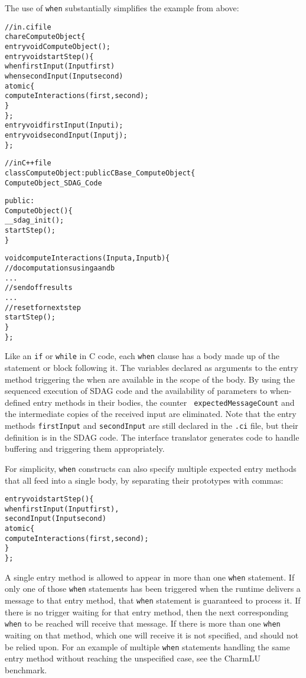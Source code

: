 The use of {\tt when} substantially simplifies the example from above:
\begin{center}
\begin{alltt}
// in .ci file
chare ComputeObject \{
  entry void ComputeObject();
  entry void startStep() \{
    when firstInput(Input first)
      when secondInput(Input second)
        atomic \{
          computeInteractions(first, second);
        \}
  \};
  entry void firstInput(Input i);
  entry void secondInput(Input j);
\};

// in C++ file
class ComputeObject : public CBase_ComputeObject \{
  ComputeObject_SDAG_Code

public:
  ComputeObject() \{
    __sdag_init();
    startStep();
  \}

  void computeInteractions(Input a, Input b) \{
    // do computations using a and b
    . . .
    // send off results
    . . .
    // reset for next step
    startStep();
  \}
\};
\end{alltt}
\end{center}
Like an {\tt if} or {\tt while} in C code, each {\tt when} clause has a body
made up of the statement or block following it. The variables declared as
arguments to the entry method triggering the when are available in the scope of
the body. By using the sequenced execution of SDAG code and the availability of
parameters to when-defined entry methods in their bodies, the counter {\tt
  expectedMessageCount} and the intermediate copies of the received input are
eliminated. Note that the entry methods {\tt firstInput} and {\tt secondInput}
are still declared in the {\tt .ci} file, but their definition is in the SDAG
code. The interface translator generates code to handle buffering and
triggering them appropriately.

For simplicity, {\tt when} constructs can also specify multiple expected entry
methods that all feed into a single body, by separating their prototypes with
commas:
\begin{center}
\begin{alltt}
entry void startStep() \{
  when firstInput(Input first),
       secondInput(Input second)
    atomic \{
      computeInteractions(first, second);
    \}
\};
\end{alltt}
\end{center}

A single entry method is allowed to appear in more than one {\tt when} statement.
If only one of those {\tt when} statements has been triggered when the runtime
delivers a message to that entry method, that {\tt when} statement is guaranteed
to process it. If there is no trigger waiting for that entry method, then the
next corresponding {\tt when} to be reached will receive that message. If there is
more than one {\tt when} waiting on that method, which one will receive it is not
specified, and should not be relied upon. For an example of multiple {\tt when}
statements handling the same entry method without reaching the unspecified case,
see the CharmLU benchmark.


